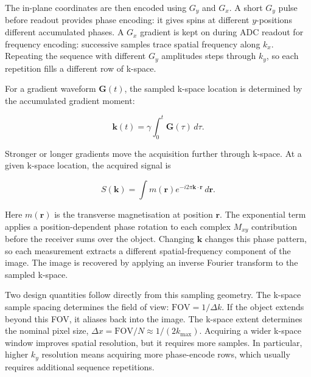 The in-plane coordinates are then encoded using \(G_y\) and \(G_x\). A
short \(G_y\) pulse before readout provides phase encoding: it gives
spins at different \(y\)-positions different accumulated phases. A
\(G_x\) gradient is kept on during ADC readout for frequency encoding:
successive samples trace spatial frequency along \(k_x\). Repeating the
sequence with different \(G_y\) amplitudes steps through \(k_y\), so each
repetition fills a different row of k-space.


For a gradient waveform \(\mathbf{G}(t)\), the sampled k-space location
is determined by the accumulated gradient moment:

\begin{equation}
    \mathbf{k}(t) = \gamma\int_0^t \mathbf{G}(\tau)\,d\tau.
\end{equation}

Stronger or longer gradients move the acquisition further through
k-space. At a given k-space location, the acquired signal is

\begin{equation}
    S(\mathbf{k}) =
    \int m(\mathbf{r})e^{-i2\pi\mathbf{k}\cdot\mathbf{r}}\,d\mathbf{r}.
\end{equation}

Here \(m(\mathbf{r})\) is the transverse magnetisation at position
\(\mathbf{r}\). The exponential term applies a position-dependent phase
rotation to each complex \(M_{xy}\) contribution before the receiver sums
over the object. Changing \(\mathbf{k}\) changes this phase pattern, so
each measurement extracts a different spatial-frequency component of the
image. The image is recovered by applying an inverse Fourier transform to
the sampled k-space.

Two design quantities follow directly from this sampling geometry. The
k-space sample spacing determines the field of view:
\(\mathrm{FOV}=1/\Delta k\). If the object extends beyond this FOV, it
aliases back into the image. The k-space extent determines the nominal
pixel size, \(\Delta x=\mathrm{FOV}/N\approx 1/(2k_{\max})\). Acquiring
a wider k-space window improves spatial resolution, but it requires more
samples. In particular, higher \(k_y\) resolution means acquiring more
phase-encode rows, which usually requires additional sequence
repetitions.


